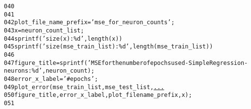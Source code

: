 \begin{alltt}
\textcolor{linenr}{040  }    
\textcolor{linenr}{041  }
\textcolor{linenr}{042  }plot\_file\_name\_prefix = \textcolor{string}{'mse\_for\_neuron\_counts'};
\textcolor{linenr}{043  }x = neuron\_count\_list;
\textcolor{linenr}{044  }sprintf(\textcolor{string}{'size(x): \%d'}, length(x) )
\textcolor{linenr}{045  }sprintf(\textcolor{string}{'size(mse\_train\_list): \%d'}, length(mse\_train\_list))
\textcolor{linenr}{046  }
\textcolor{linenr}{047  }figure\_title = sprintf(\textcolor{string}{'MSE for the number of epochs used - Simple Regression - neurons: \%d'}, neuron\_count);
\textcolor{linenr}{048  }error\_x\_label = \textcolor{string}{'\# epochs'};
\textcolor{linenr}{049  }plot\_error(mse\_train\_list, mse\_test\_list, \textcolor{keyword}{\underline{...}}
\textcolor{linenr}{050  }   figure\_title, error\_x\_label, plot\_filename\_prefix, x); 
\textcolor{linenr}{051  }
\end{alltt}
